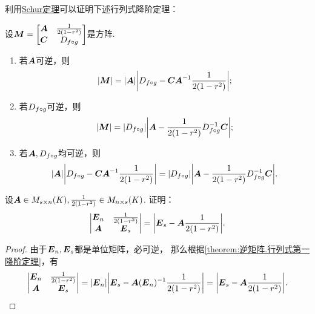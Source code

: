 利用\hyperref[theorem:逆矩阵.Schur定理]{Schur定理}可以证明下述行列式降阶定理：
\begin{theorem}[行列式第一降阶定理]\label{theorem:逆矩阵.行列式第一降阶定理}
\def\M{\mat{M}}
设\(\M = \begin{bmatrix}
\A & \B \\
\C & \D
\end{bmatrix}\)是方阵.\begin{enumerate}
\item 若\(\A\)可逆，则\[
\abs{\M} = \abs{\A} \abs{\D - \C \A^{-1} \B};
\]

\item 若\(\D\)可逆，则\[
\abs{\M} = \abs{\D} \abs{\A - \B \D^{-1} \C};
\]

\item 若\(\A,\D\)均可逆，则\[
\abs{\A} \abs{\D - \C \A^{-1} \B}
= \abs{\D} \abs{\A - \B \D^{-1} \C}.
\]
\end{enumerate}
\end{theorem}

\begin{example}\label{example:逆矩阵.行列式降阶定理的重要应用1}
设\(\A \in M_{s \times n}(K),
\B \in M_{n \times s}(K)\).
证明：\[
	\begin{vmatrix}
		\E_n & \B \\
		\A & \E_s
	\end{vmatrix} = \abs{\E_s - \A\B}.
\]
\begin{proof}
由于\(\E_n,\E_s\)都是单位矩阵，必可逆，
那么根据\cref{theorem:逆矩阵.行列式第一降阶定理}，有\[
	\begin{vmatrix}
		\E_n & \B \\
		\A & \E_s
	\end{vmatrix} = \abs{\E_n} \abs{\E_s - \A(\E_n)^{-1}\B}
	= \abs{\E_s - \A\B}.
	\qedhere
\]
\end{proof}
\end{example}

